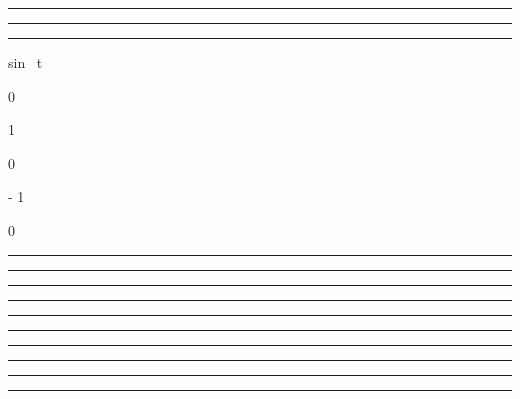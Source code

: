 \documentclass[]{article}
\begin{document}
\begin{center}\rule{3in}{0.4pt}\end{center}

\begin{center}\rule{3in}{0.4pt}\end{center}

\begin{center}\rule{3in}{0.4pt}\end{center}

sin~ t

0

\nearrow

1

\searrow

0

\searrow

- 1

\nearrow

0

\begin{center}\rule{3in}{0.4pt}\end{center}

\begin{center}\rule{3in}{0.4pt}\end{center}

\begin{center}\rule{3in}{0.4pt}\end{center}

\begin{center}\rule{3in}{0.4pt}\end{center}

\begin{center}\rule{3in}{0.4pt}\end{center}

\begin{center}\rule{3in}{0.4pt}\end{center}

\begin{center}\rule{3in}{0.4pt}\end{center}

\begin{center}\rule{3in}{0.4pt}\end{center}

\begin{center}\rule{3in}{0.4pt}\end{center}

\begin{center}\rule{3in}{0.4pt}\end{center}
\end{document}
